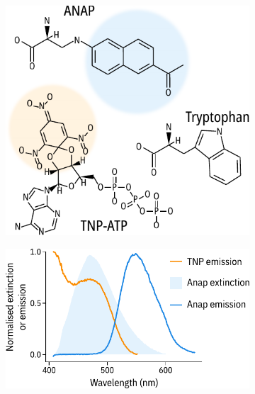 \begin{figure}[h]
	\centering
	\begin{subfigure}[t]{0.4\textwidth}
		\caption{}\label{ch3fig:chemical_structures}
		\centering
		\includegraphics[width=\textwidth]{chemical_structures.pdf}
	\end{subfigure}
	\hfill
	\parbox[t]{0.5\textwidth}{
	\begin{subfigure}[t]{0.5\textwidth}
		\caption{}\label{ch3fig:spectral_overlap}
		\centering
		\includegraphics[width=\textwidth]{spectral_overlap.pdf}
	\end{subfigure}
	\hfill
	\begin{subfigure}[t]{0.5\textwidth}
		\caption{}\label{ch3fig:fret_efficiency}

\end{subfigure}}
\end{figure}
